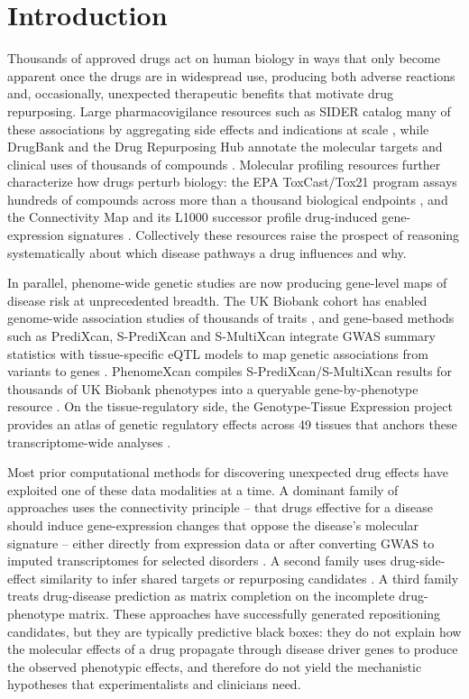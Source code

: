 \section{Introduction}

Thousands of approved drugs act on human biology in ways that only become
apparent once the drugs are in widespread use, producing both adverse
reactions and, occasionally, unexpected therapeutic benefits that motivate
drug repurposing. Large pharmacovigilance resources such as SIDER catalog
many of these associations by aggregating side effects and indications at
scale \cite{kuhn2016sider}, while DrugBank and the Drug Repurposing Hub
annotate the molecular targets and clinical uses of thousands of
compounds \cite{knox2024drugbank,corsello2017repurposing}. Molecular
profiling resources further characterize how drugs perturb biology: the EPA
ToxCast/Tox21 program assays hundreds of compounds across more than a
thousand biological endpoints \cite{richard2016toxcast}, and the
Connectivity Map and its L1000 successor profile drug-induced gene-expression
signatures \cite{lamb2006cmap,subramanian2017lincs}. Collectively these
resources raise the prospect of reasoning systematically about which disease
pathways a drug influences and why.

In parallel, phenome-wide genetic studies are now producing gene-level maps
of disease risk at unprecedented breadth. The UK Biobank cohort has enabled
genome-wide association studies of thousands of traits
\cite{bycroft2018ukbiobank}, and gene-based methods such as PrediXcan,
S-PrediXcan and S-MultiXcan integrate GWAS summary statistics with
tissue-specific eQTL models to map genetic associations from variants to
genes \cite{gamazon2015predixcan,barbeira2018spredixcan,barbeira2019smultixcan}.
PhenomeXcan compiles S-PrediXcan/S-MultiXcan results for thousands of
UK Biobank phenotypes into a queryable gene-by-phenotype resource
\cite{pividori2020phenomexcan}. On the tissue-regulatory side, the Genotype-Tissue
Expression project provides an atlas of genetic regulatory effects
across 49 tissues that anchors these transcriptome-wide analyses \cite{gtex2020atlas}.

Most prior computational methods for discovering unexpected drug effects
have exploited one of these data modalities at a time. A dominant family of
approaches uses the connectivity principle -- that drugs effective for a
disease should induce gene-expression changes that oppose the disease's
molecular signature -- either directly from expression data
\cite{lamb2006cmap,sirota2011drugrepo} or after converting GWAS to
imputed transcriptomes for selected disorders
\cite{so2017neuropsychiatric,reay2020pes,grotzinger2023tsem}. A second family
uses drug-side-effect similarity to infer shared targets or repurposing
candidates \cite{campillos2008sideeffect}. A third family treats drug-disease
prediction as matrix completion on the incomplete drug-phenotype matrix.
These approaches have successfully generated repositioning candidates, but
they are typically predictive black boxes: they do not explain how the
molecular effects of a drug propagate through disease driver genes to
produce the observed phenotypic effects, and therefore do not yield the
mechanistic hypotheses that experimentalists and clinicians need.

